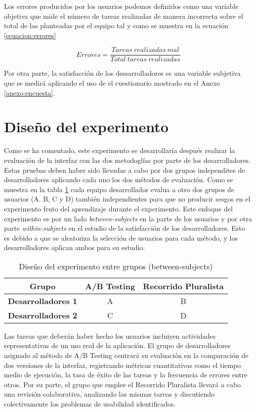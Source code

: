 \documentclass[a4paper,12pt]{report}
\begin{document}
Los errores producidos por los usuarios podemos definirlos como una variable objetiva que mide el número de tareas realizadas de manera incorrecta sobre el total de las planteadas por el equipo tal y como se muestra en la ecuación \ref{ecuacion:errores}

\begin{equation}
Errores = \frac{Tareas\ realizadas\ mal}{Total\ tareas\ realizadas}
\label{ecuacion:errores}
\end{equation}

Por otra parte, la satisfacción de los dessarrolladores es una variable subjetiva que se medirá aplicando el uso de el cuestionario mostrado en el Anexo \ref{anexo:encuesta}. 

\section{Diseño del experimento}
Como se ha comentado, este experimento se desarrollaría después realizar la evaluación de la interfaz con las dos metodoglías por parte de los desarrolladores. Estas pruebas deben haber sido llevadas a cabo por dos grupos independites de desarrolladores aplicando cada uno los dos métodos de evaluación. Como se muestra en la tabla \ref{tab:diseño_experimento} cada equipo desarrollador evalua a otro dos grupos de usuarios (A. B, C y D) también independientes para que no producir sesgos en el experimento fruto del aprendizaje durante el experimento. Este enfoque del experimento es por un lado \textit{between-subjects} en la parte de los usuarios y por otra parte \textit{within-subjects} en el estudio de la satisfacción de los desarrolladores. Esto es debido a que se aleatoriza la selección de usuarios para cada método, y los desarrolladores aplican ambos para su estudio. 

\begin{table}[h]
\centering
\begin{tabular}{|c|c|c|}
\hline
\textbf{Grupo} & \textbf{A/B Testing} & \textbf{Recorrido Pluralista} \\ \hline
\textbf{Desarrolladores 1} & A & B \\ \hline
\textbf{Desarrolladores 2} & C & D \\ \hline
\end{tabular}
\caption{Diseño del experimento entre grupos (between-subjects)}
\label{tab:diseño_experimento}
\end{table}

Las tareas que deberán haber hecho los usuarios incluiyen actividades representativas de un uso real de la aplicación. El grupo de desarrolladores asignado al método de A/B Testing centrará su evaluación en la comparación de dos versiones de la interfaz, registrando métricas cuantitativas como el tiempo medio de ejecución, la tasa de éxito de las tareas y la frecuencia de errores entre otros. Por su parte, el grupo que emplee el Recorrido Pluralista llevará a cabo una revisión colaborativa, analizando las mismas tareas y discutiendo colectivamente los problemas de usabilidad identificados.
\end{document}
